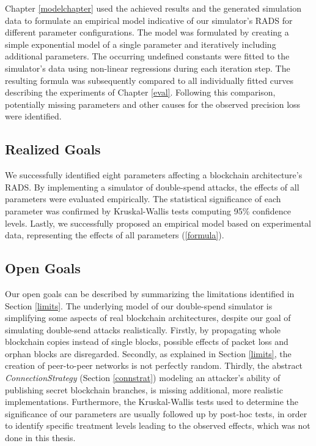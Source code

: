 \documentclass[a4paper,12pt,twoside]{report}
\begin{document}
Chapter \ref{modelchapter} used the achieved results and the generated simulation data to formulate an empirical model indicative of our simulator's RADS for different parameter configurations. The model was formulated by creating a simple exponential model of a single parameter and iteratively including additional parameters. The occurring undefined constants were fitted to the simulator's data using non-linear regressions during each iteration step. The resulting formula was subsequently compared to all individually fitted curves describing the experiments of Chapter \ref{eval}. Following this comparison, potentially missing parameters and other causes for the observed precision loss were identified. 
\subsection{Realized Goals}
We successfully identified eight parameters affecting a blockchain architecture's RADS. By implementing a simulator of double-spend attacks, the effects of all parameters were evaluated empirically. The statistical significance of each parameter was confirmed by Kruskal-Wallis tests computing 95\% confidence levels. Lastly, we successfully proposed an empirical model based on experimental data, representing the effects of all parameters (\autoref{formula}). 
\subsection{Open Goals}
Our open goals can be described by summarizing the limitations identified in Section \ref{limits}. The underlying model of our double-spend simulator is simplifying some aspects of real blockchain architectures, despite our goal of simulating double-send attacks realistically. Firstly, by propagating whole blockchain copies instead of single blocks, possible effects of packet loss and orphan blocks are disregarded. Secondly, as explained in Section \ref{limits}, the creation of peer-to-peer networks is not perfectly random. Thirdly, the abstract \textit{ConnectionStrategy} (Section \ref{connstrat}) modeling an attacker's ability of publishing secret blockchain branches, is missing additional, more realistic implementations. Furthermore, the Kruskal-Wallis tests used to determine the significance of our parameters are usually followed up by post-hoc tests, in order to identify specific treatment levels leading to the observed effects, which was not done in this thesis.
\end{document}
